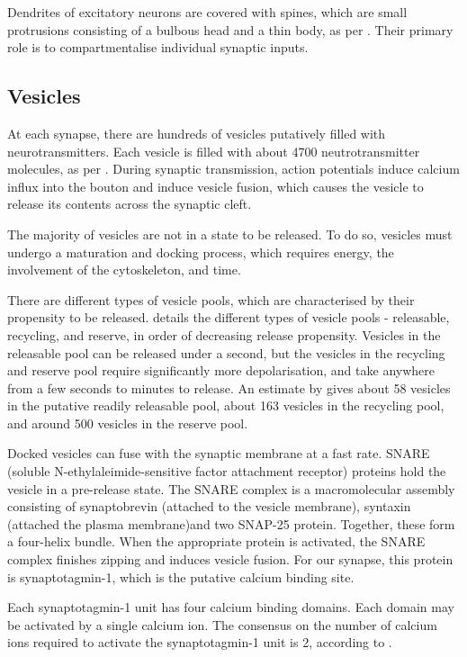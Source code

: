 \documentclass[a4paper]{article}
\begin{document}
Dendrites of excitatory neurons are covered with spines, which are small protrusions consisting of a bulbous head and a thin body, as per \cite{Arellano:FrontNeurosci:2007}. Their primary role is to compartmentalise individual synaptic inputs.

\subsection{Vesicles}
At each synapse, there are hundreds of vesicles putatively filled with neurotransmitters. Each vesicle is filled with about 4700 neutrotransmitter molecules, as per \cite{Bruns:Nature:1995}. During synaptic transmission, action potentials induce calcium influx into the bouton and induce vesicle fusion, which causes the vesicle to release its contents across the synaptic cleft.

The majority of vesicles are not in a state to be released. To do so, vesicles must undergo a maturation and docking process, which requires energy, the involvement of the cytoskeleton, and time. 

There are different types of vesicle pools, which are characterised by their propensity to be released. \cite{rizzoli2005synaptic} details the different types of vesicle pools - releasable, recycling, and reserve, in order of decreasing release propensity. Vesicles in the releasable pool can be released under a second, but the vesicles in the recycling and reserve pool require significantly more depolarisation, and take anywhere from a few seconds to minutes to release. An estimate by \cite{Rollehagen::2015} gives about 58 vesicles in the putative readily releasable pool, about 163 vesicles in the recycling pool, and around 500 vesicles in the reserve pool.

Docked vesicles can fuse with the synaptic membrane at a fast rate. SNARE (soluble N-ethylaleimide-sensitive factor attachment receptor) proteins hold the vesicle in a pre-release state. The SNARE complex is a macromolecular assembly consisting of synaptobrevin (attached to the vesicle membrane), syntaxin (attached the plasma membrane)and two SNAP-25 protein. Together, these form a four-helix bundle. When the appropriate protein is activated, the SNARE complex finishes zipping and induces vesicle fusion. For our synapse, this protein is synaptotagmin-1, which is the putative calcium binding site. 

Each synaptotagmin-1 unit has four calcium binding domains. Each domain may be activated by a single calcium ion. The consensus on the number of calcium ions required to activate the synaptotagmin-1 unit is 2, according to \cite{Dittrich:BiophysJ:2013}.
\end{document}
